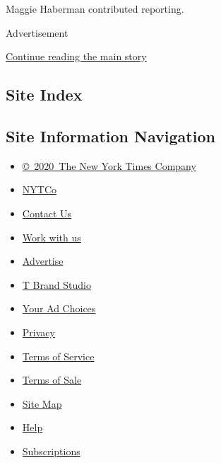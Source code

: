 Maggie Haberman contributed reporting.

Advertisement

\protect\hyperlink{after-bottom}{Continue reading the main story}

\hypertarget{site-index}{%
\subsection{Site Index}\label{site-index}}

\hypertarget{site-information-navigation}{%
\subsection{Site Information
Navigation}\label{site-information-navigation}}

\begin{itemize}
\tightlist
\item
  \href{https://help.nytimes3xbfgragh.onion/hc/en-us/articles/115014792127-Copyright-notice}{©~2020~The
  New York Times Company}
\end{itemize}

\begin{itemize}
\tightlist
\item
  \href{https://www.nytco.com/}{NYTCo}
\item
  \href{https://help.nytimes3xbfgragh.onion/hc/en-us/articles/115015385887-Contact-Us}{Contact
  Us}
\item
  \href{https://www.nytco.com/careers/}{Work with us}
\item
  \href{https://nytmediakit.com/}{Advertise}
\item
  \href{http://www.tbrandstudio.com/}{T Brand Studio}
\item
  \href{https://www.nytimes3xbfgragh.onion/privacy/cookie-policy\#how-do-i-manage-trackers}{Your
  Ad Choices}
\item
  \href{https://www.nytimes3xbfgragh.onion/privacy}{Privacy}
\item
  \href{https://help.nytimes3xbfgragh.onion/hc/en-us/articles/115014893428-Terms-of-service}{Terms
  of Service}
\item
  \href{https://help.nytimes3xbfgragh.onion/hc/en-us/articles/115014893968-Terms-of-sale}{Terms
  of Sale}
\item
  \href{https://spiderbites.nytimes3xbfgragh.onion}{Site Map}
\item
  \href{https://help.nytimes3xbfgragh.onion/hc/en-us}{Help}
\item
  \href{https://www.nytimes3xbfgragh.onion/subscription?campaignId=37WXW}{Subscriptions}
\end{itemize}
